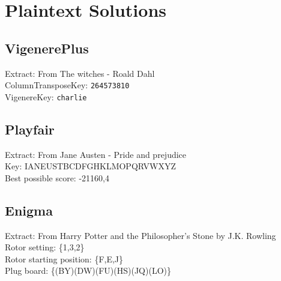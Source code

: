 \documentclass{article}
\begin{document}
\newpage

\section{Plaintext Solutions}
\subsection{VigenerePlus}
Extract: From The witches - Roald Dahl\\
ColumnTransposeKey: \texttt{264573810}\\
VigenereKey: \texttt{charlie}\\

\subsection{Playfair}
Extract: From Jane Austen - Pride and prejudice\\
Key: IANEUSTBCDFGHKLMOPQRVWXYZ\\
Best possible score: -21160,4

\subsection{Enigma}

Extract: From Harry Potter and the Philosopher's Stone by J.K. Rowling\\
Rotor setting: \{1,3,2\}\\
Rotor starting position: \{F,E,J\}\\
Plug board: \{(BY)(DW)(FU)(HS)(JQ)(LO)\}\\
\end{document}
